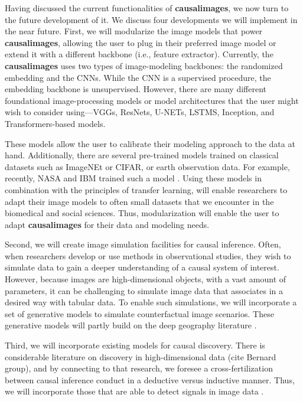 \documentclass[nojss,shortnames]{jss} %
\begin{document}
Having discussed the current functionalities of {\bf causalimages}, we now turn to the future development of it.  We discuss four developments we will implement in the near future. First, we will modularize the image models that power {\bf causalimages}, allowing the user to plug in their preferred image model or extend it with a different backbone (i.e., feature extractor). Currently, the {\bf causalimages} uses two types of image-modeling backbones: the randomized embedding and the CNNs. While the CNN is a supervised procedure, the embedding backbone is unsupervised. However, there are many different foundational image-processing models or model architectures that the user might wish to consider using---VGGs, ResNets, U-NETs, LSTMS, Inception, and Transformers-based models. 

These models allow the user to calibrate their modeling approach to the data at hand. Additionally, there are several pre-trained models trained on classical datasets such as ImageNEt or CIFAR, or earth observation data. For example, recently, NASA and IBM trained such a model \citep{fraccaro_hls_2023}. Using these models in combination with the principles of transfer learning, will enable researchers to adapt their image models to often small datasets that we encounter in the biomedical and social sciences. Thus, modularization will enable the user to adapt {\bf causalimages} for their data and modeling needs.

Second, we will create image simulation facilities for causal inference. Often, when researchers develop or use methods in observational studies, they wish to simulate data to gain a deeper understanding of a causal system of interest. However, because images are high-dimensional objects, with a vast amount of parameters, it can be challenging to simulate image data that associates in a desired way with tabular data. To enable such simulations, we will incorporate a set of generative models to simulate counterfactual image scenarios. These generative models will partly build on the deep geography literature \citep{zhao_deep_2021}.

Third, we will incorporate existing models for causal discovery. There is considerable literature on discovery in high-dimensional data (cite Bernard group), and by connecting to that research, we foresee a cross-fertilization between causal inference conduct in a deductive versus inductive manner. Thus, we will incorporate those that are able to detect signals in image data \citep{lopez-paz_discovering_2017}. 
\end{document}
